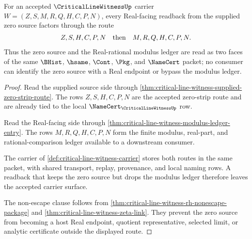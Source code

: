 \begin{theorem}
\label{thm:critical-line-witness-zero-source-real-readback-factorization}
For an accepted $\CriticalLineWitnessUp$ carrier $W=(Z,S,M,R,Q,H,C,P,N)$, every Real-facing readback from the supplied zero source factors through the route
$$
Z,S,H,C,P,N
\quad\hbox{then}\quad
M,R,Q,H,C,P,N.
$$
Thus the zero source and the Real-rational modulus ledger are read as two faces of the same $\BHist$, $\hsame$, $\Cont$, $\Pkg$, and $\NameCert$ packet; no consumer can identify the zero source with a Real endpoint or bypass the modulus ledger.
\end{theorem}
\begin{proof}
Read the supplied source side through \autoref{thm:critical-line-witness-supplied-zero-strip-route}. The rows $Z,S,H,C,P,N$ are the accepted zero-strip route and are already tied to the local $\NameCert_{\CriticalLineWitnessUp}$ row.

Read the Real-facing side through \autoref{thm:critical-line-witness-modulus-ledger-entry}. The rows $M,R,Q,H,C,P,N$ form the finite modulus, real-part, and rational-comparison ledger available to a downstream consumer.

The carrier of \autoref{def:critical-line-witness-carrier} stores both routes in the same packet, with shared transport, replay, provenance, and local naming rows. A readback that keeps the zero source but drops the modulus ledger therefore leaves the accepted carrier surface.

The non-escape clause follows from \autoref{thm:critical-line-witness-rh-nonescape-package} and \autoref{thm:critical-line-witness-zeta-link}. They prevent the zero source from becoming a host Real endpoint, quotient representative, selected limit, or analytic certificate outside the displayed route.
\end{proof}

